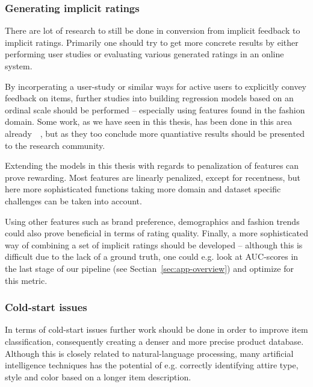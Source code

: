 \subsubsection{Generating implicit ratings}

There are lot of research to still be done in conversion from implicit feedback
to implicit ratings. Primarily one should try to get more concrete results by
either performing user studies or evaluating various generated ratings in an
online system.

By incorperating a user-study or similar ways for active users to explicitly
convey feedback on items, further studies into building regression models based
on an ordinal scale should be performed -- especially using features found in
the fashion domain. Some work, as we have seen in this thesis, has been done in
this area already~\cite{parra2011walk}~\cite{parra2011implicit}, but as they
too conclude more quantiative results should be presented to the research
community.

Extending the models in this thesis with regards to penalization of features
can prove rewarding. Most features are linearly penalized, except for
recentness, but here more sophisticated functions taking more domain and
dataset specific challenges can be taken into account.

Using other features such as brand preference, demographics and fashion trends
could also prove beneficial in terms of rating quality. Finally, a more
sophisticated way of combining a set of implicit ratings should be developed --
although this is difficult due to the lack of a ground truth, one could e.g.
look at AUC-scores in the last stage of our pipeline (see
Sectian~\ref{sec:app-overview}) and optimize for this metric.

\subsubsection{Cold-start issues}

In terms of cold-start issues further work should be done in order to improve
item classification, consequently creating a denser and more precise product
database. Although this is closely related to natural-language processing, many
artificial intelligence techniques has the potential of e.g. correctly
identifying attire type, style and color based on a longer item description.


